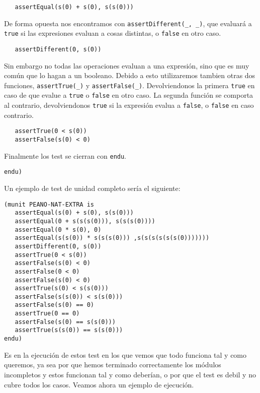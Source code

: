 {\codesize
\begin{verbatim}
   assertEqual(s(0) + s(0), s(s(0)))
\end{verbatim}
}

De forma opuesta nos encontramos con \verb"assertDifferent(_, _)", que evaluará a \texttt{true} si las expresiones evaluan a cosas distintas, o \texttt{false} en otro caso. \par

{\codesize
\begin{verbatim}
   assertDifferent(0, s(0))
\end{verbatim}
}

Sin embargo no todas las operaciones evaluan a una expresión, sino que es muy común que lo hagan a un booleano. Debido a esto utilizaremos tambien otras dos funciones, \verb"assertTrue(_)" y \verb"assertFalse(_)". Devolviendonos la primera \texttt{true} en caso de que evalue a \texttt{true} o \texttt{false} en otro caso. La segunda función se comporta al contrario, devolviendonos \texttt{true} si la expresión evalua a \texttt{false}, o \texttt{false} en caso contrario.\par

{\codesize
\begin{verbatim}
   assertTrue(0 < s(0))
   assertFalse(s(0) < 0)
\end{verbatim}
}

Finalmente los test se cierran con \texttt{endu}. \par

{\codesize
\begin{verbatim}
endu)
\end{verbatim}
}

Un ejemplo de test de unidad completo sería el siguiente: \par

{\codesize
\begin{verbatim}
(munit PEANO-NAT-EXTRA is
   assertEqual(s(0) + s(0), s(s(0)))
   assertEqual(0 + s(s(s(0))), s(s(s(0))))
   assertEqual(0 * s(0), 0)
   assertEqual(s(s(0)) * s(s(s(0))) ,s(s(s(s(s(s(0)))))))
   assertDifferent(0, s(0))
   assertTrue(0 < s(0))
   assertFalse(s(0) < 0)
   assertFalse(0 < 0)
   assertFalse(s(0) < 0)
   assertTrue(s(0) < s(s(0)))
   assertFalse(s(s(0)) < s(s(0)))
   assertFalse(s(0) == 0)
   assertTrue(0 == 0)
   assertFalse(s(0) == s(s(0)))
   assertTrue(s(s(0)) == s(s(0)))
endu)

\end{verbatim}
}

Es en la ejecución de estos test en los que vemos que todo funciona tal y como queremos, ya sea por que hemos terminado correctamente los módulos incompletos y estos funcionan tal y como deberían, o por que el test es debil y no cubre todos los casos. Veamos ahora un ejemplo de ejecución. \par

